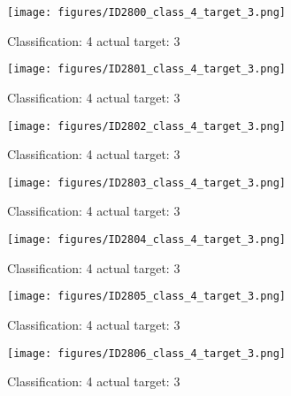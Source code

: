 \begin{figure}[h!]
\begin{center}
\texttt{[image: figures/ID2800\_class\_4\_target\_3.png]}
\end{center}
\caption{ Classification: 4 actual target: 3}
\label{fig:ID2800_class_4_target_3}
\end{figure}
\begin{figure}[h!]
\begin{center}
\texttt{[image: figures/ID2801\_class\_4\_target\_3.png]}
\end{center}
\caption{ Classification: 4 actual target: 3}
\label{fig:ID2801_class_4_target_3}
\end{figure}
\begin{figure}[h!]
\begin{center}
\texttt{[image: figures/ID2802\_class\_4\_target\_3.png]}
\end{center}
\caption{ Classification: 4 actual target: 3}
\label{fig:ID2802_class_4_target_3}
\end{figure}
\begin{figure}[h!]
\begin{center}
\texttt{[image: figures/ID2803\_class\_4\_target\_3.png]}
\end{center}
\caption{ Classification: 4 actual target: 3}
\label{fig:ID2803_class_4_target_3}
\end{figure}
\begin{figure}[h!]
\begin{center}
\texttt{[image: figures/ID2804\_class\_4\_target\_3.png]}
\end{center}
\caption{ Classification: 4 actual target: 3}
\label{fig:ID2804_class_4_target_3}
\end{figure}
\begin{figure}[h!]
\begin{center}
\texttt{[image: figures/ID2805\_class\_4\_target\_3.png]}
\end{center}
\caption{ Classification: 4 actual target: 3}
\label{fig:ID2805_class_4_target_3}
\end{figure}
\begin{figure}[h!]
\begin{center}
\texttt{[image: figures/ID2806\_class\_4\_target\_3.png]}
\end{center}
\caption{ Classification: 4 actual target: 3}
\label{fig:ID2806_class_4_target_3}
\end{figure}
